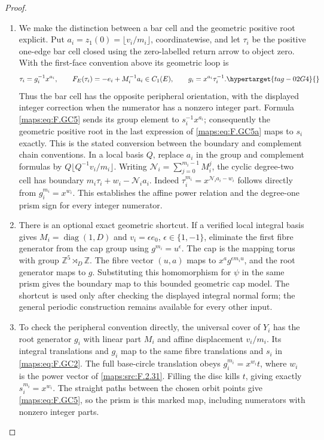 \documentclass[11pt,a4paper]{article}
\numberwithin{equation}{section}
\theoremstyle{definition}
\begin{document}
\begin{proof}
\begin{enumerate}[label=\arabic*.]
\item We make the distinction between a bar cell and the geometric
positive root explicit.  Put
$a_i=z_1(0)=\lfloor v_i/m_i\rfloor$, coordinatewise, and
let $\tau_i$ be the positive one-edge bar cell closed using
the zero-labelled return arrow to object zero.  With the
first-face convention above its geometric loop is
\begin{equation}
 \tau_i=g_i^{-1}x^{a_i},\qquad
 F_E(\tau_i)=-e_i+M_i^{-1}a_i\in C_1(E),\qquad
 g_i=x^{a_i}\tau_i^{-1}.                                  \hypertarget{tag-02G4}{}\label{maps:eq:F.GC5a}
\end{equation}
Thus the bar cell has the opposite peripheral orientation,
with the displayed integer correction when the numerator
has a nonzero integer part.  Formula \eqref{maps:eq:F.GC5} sends its
group element to $s_i^{-1}x^{a_i}$; consequently the
geometric positive root in the last expression of \eqref{maps:eq:F.GC5a}
maps to $s_i$ exactly.  This is the stated conversion between
the boundary and complement chain conventions.  In a local basis
$Q$, replace $a_i$ in the group and complement formulas by
$Q\lfloor Q^{-1}v_i/m_i\rfloor$.
Writing $\mathcal N_i=\sum_{j=0}^{m_i-1}M_i^j$, the cyclic
degree-two cell has boundary
$m_i\tau_i+w_i-\mathcal N_i a_i$.
Indeed $\tau_i^{m_i}=x^{\mathcal N_i a_i-w_i}$ follows
directly from $g_i^{m_i}=x^{w_i}$.
This establishes the affine power relation and the degree-one
prism sign for every integer numerator.

\item There is an optional exact geometric shortcut.  If a verified
local integral basis gives $M_i=\operatorname{diag}(1,D)$ and
$v_i=\epsilon e_0$, $\epsilon\in\{1,-1\}$, eliminate the
first fibre generator from the cap group using
$g^{m_i}=u^\epsilon$.  The cap is the mapping torus with
group $\mathbb Z^5\rtimes_D\mathbb Z$.
The fibre vector $(u,a)$ maps to $x^a g^{\epsilon m_i u}$,
and the root generator maps to $g$.  Substituting this
homomorphism for $\psi$ in the same prism gives the boundary
map to this bounded geometric cap model.  The shortcut is
used only after checking the displayed integral normal form;
the general periodic construction remains available for
every other input.

\item To check the peripheral convention directly, the universal
cover of $Y_i$ has the root generator $g_i$ with linear part
$M_i$ and affine displacement $v_i/m_i$.  Its integral
translations and $g_i$ map to the same fibre translations
and $s_i$ in \eqref{maps:eq:F.GC2}.  The full base-circle translation obeys
$g_i^{m_i}=x^{w_i}t$, where $w_i$ is the power vector of
\ref{maps:src:F.2.31}.  Filling the disc kills $t$, giving exactly
$s_i^{m_i}=x^{w_i}$.  The straight paths between the chosen
orbit points give \eqref{maps:eq:F.GC5}, so the prism is this marked map,
including numerators with nonzero integer parts.


\end{enumerate}
\end{proof}
\end{document}
